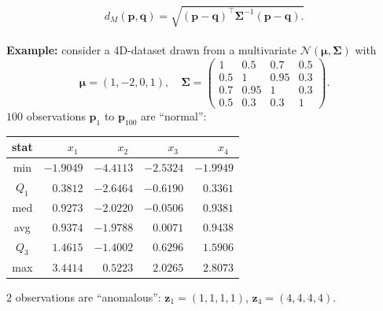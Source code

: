 \documentclass[20pt,landscape,footrule,headrule]{foils}
\begin{document}
$$
d_M(\mathbf{p},\mathbf{q})=\sqrt{(\mathbf{p} - \mathbf{q})^{\!\top} \mathbf{\Sigma}^{-1} (\mathbf{p} - \mathbf{q}).}
$$
\newpage\ \\ \noindent 
\textbf{Example:} consider a 4D-dataset drawn from a multivariate  $\mathcal{N}(\mathbf{\mu},\mathbf{\Sigma})$ with  
\small $$\mathbf{\mu}=(1,-2,0,1),\quad \mathbf{\Sigma}=\begin{pmatrix}1 & 0.5 & 0.7 & 0.5 \\ 0.5 & 1 & 0.95 & 0.3 \\ 0.7 & 0.95 & 1 & 0.3 \\ 0.5 & 0.3 & 0.3 & 1\end{pmatrix}.$$\normalsize
$100$ observations $\mathbf{p}_1$ to $\mathbf{p}_{100}$ are ``normal'': 
\small \begin{center}
\begin{tabular}{crrrr}
\textbf{stat} & $x_1\ \ $ & $x_2\ \ $ & $x_3\ \ $ & $x_4\ \ $ \\ \hline          
 min   & $-1.9049$  & $-4.4113$ & $-2.5324$ & $-1.9949$ \\ 
 $Q_1$ &  $ 0.3812$  & $-2.6464$ & $-0.6190$ & $ 0.3361$ \\ 
 med   &  $ 0.9273$  & $-2.0220$ & $-0.0506$ & $ 0.9381$ \\ 
 avg  &  $ 0.9374$  & $-1.9788$ & $ 0.0071$ & $ 0.9438$ \\ 
 $Q_3$ &  $ 1.4615$  & $-1.4002$ & $ 0.6296$ & $ 1.5906$ \\ 
 max   &  $ 3.4414$  & $0.5223$  & $ 2.0265$ & $ 2.8073$ \\
 \end{tabular}
\end{center}\normalsize
$2$ observations are ``anomalous'':  $\mathbf{z}_1=(1,1,1,1)$, $\mathbf{z}_4=(4,4,4,4)$. 
\end{document}
